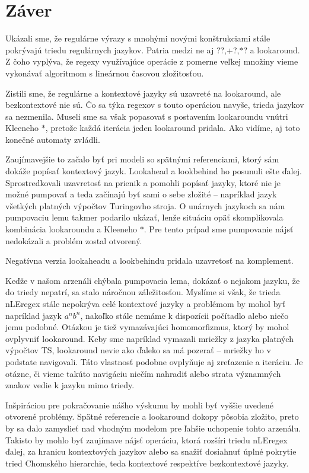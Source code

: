 \chapter*{Záver}\label{chap:conc}
{}

Ukázali sme, že regulárne výrazy s mnohými novými konštrukciami stále pokrývajú triedu regulárnych jazykov. Patria medzi ne aj {\ttfamily \selectfont ??,+?,$*$?} a lookaround. Z čoho vyplýva, že regexy využívajúce operácie z pomerne veľkej množiny vieme vykonávať algoritmom s lineárnou časovou zložitosťou.

Zistili sme, že regulárne a kontextové jazyky sú uzavreté na lookaround, ale bezkontextové nie sú. Čo sa týka regexov s touto operáciou navyše, trieda jazykov sa nezmenila. Museli sme sa však popasovať s postavením lookaroundu vnútri Kleeneho $*$, pretože každá iterácia jeden lookaround pridala. Ako vidíme, aj toto konečné automaty zvládli.

Zaujímavejšie to začalo byť pri modeli so spätnými referenciami, ktorý sám dokáže popísať kontextový jazyk. Lookahead a lookbehind ho posunuli ešte ďalej. Sprostredkovali uzavretosť na prienik a pomohli popísať jazyky, ktoré nie je možné pumpovať a teda začínajú byť sami o sebe zložité -- napríklad jazyk všetkých platných výpočtov Turingovho stroja. O unárnych jazykoch sa nám pumpovaciu lemu takmer podarilo ukázať, lenže situáciu opäť skomplikovala kombinácia lookaroundu a Kleeneho $*$. Pre tento prípad sme pumpovanie nájsť nedokázali a problém zostal otvorený.

Negatívna verzia lookaheadu a lookbehindu pridala uzavretosť na komplement.

Keďže v našom arzenáli chýbala pumpovacia lema, dokázať o nejakom jazyku, že do triedy nepatrí, sa stalo náročnou záležitosťou. Myslíme si však, že trieda nLEregex stále nepokrýva celé kontextové jazyky a problémom by mohol byť napríklad jazyk $a^nb^n$, nakoľko stále nemáme k dispozícii počítadlo alebo niečo jemu podobné. Otázkou je tiež vymazávajúci homomorfizmus, ktorý by mohol ovplyvniť lookaround. Keby sme napríklad vymazali mriežky z jazyka platných výpočtov TS, lookaround nevie ako ďaleko sa má pozerať -- mriežky ho v podstate navigovali. Táto vlastnosť podobne ovplyňuje aj zreťazenie a iteráciu. Je otázne, či vieme takúto navigáciu niečím nahradiť alebo strata významných znakov vedie k jazyku mimo triedy.

Inšpiráciou pre pokračovanie nášho výskumu by mohli byť vyššie uvedené otvorené problémy. Spätné referencie a lookaround dokopy pôsobia zložito, preto by sa dalo zamyslieť nad vhodným modelom pre ľahšie uchopenie tohto arzenálu. Takisto by mohlo byť zaujímave nájsť operáciu, ktorá rozšíri triedu nLEregex ďalej, za hranicu kontextových jazykov alebo sa snažiť dosiahnuť úplné pokrytie tried Chomského hierarchie, teda kontextové respektíve bezkontextové jazyky.
